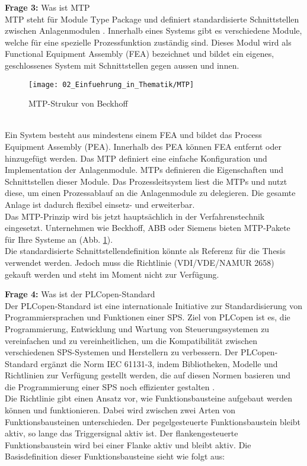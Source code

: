 	\newpage
	
	\textbf{Frage 3:} Was ist MTP \vspace{2mm} 
	\\
	MTP steht für Module Type Package und definiert standardisierte Schnittstellen zwischen Anlagenmodulen \cite{MTP}. Innerhalb eines Systems gibt es verschiedene Module, welche für eine spezielle Prozessfunktion zuständig sind. Dieses Modul wird als Functional Equipment Assembly (FEA) bezeichnet und bildet ein eigenes, geschlossenes System mit Schnittstellen gegen aussen und innen.
	\\
	\begin{figure}[h!]
		\centering
		\texttt{[image: 02\_Einfuehrung\_in\_Thematik/MTP]}
		\captionsetup{justification=centering}
		\caption{MTP-Strukur von Beckhoff}
		\label{fig:MTP}
	\end{figure}
	\\
	Ein System besteht aus mindestens einem FEA und bildet das Process Equipment Assembly (PEA). Innerhalb des PEA können FEA entfernt oder hinzugefügt werden. Das \Gls{MTP} definiert eine einfache Konfiguration und Implementation der Anlagenmodule. MTPs definieren die Eigenschaften und Schnittstellen dieser Module. Das Prozessleitsystem liest die MTPs und nutzt diese, um einen Prozessablauf an die Anlagenmodule zu delegieren. Die gesamte Anlage ist dadurch flexibel einsetz- und erweiterbar.
	\\  
	Das \Gls{MTP}-Prinzip wird bis jetzt hauptsächlich in der Verfahrenstechnik eingesetzt. Unternehmen wie Beckhoff, ABB oder Siemens bieten \Gls{MTP}-Pakete für Ihre Systeme an (Abb. \ref{fig:MTP}). 
	\\
	Die standardisierte Schnittstellendefinition könnte als Referenz für die Thesis verwendet werden. Jedoch muss die Richtlinie (VDI/VDE/NAMUR 2658) gekauft werden und steht im Moment nicht zur Verfügung. 
	\vspace{3mm}
	
	\textbf{Frage 4:} Was ist der PLCopen-Standard  \vspace{2mm} 
	\\
	Der PLCopen-Standard ist eine internationale Initiative zur Standardisierung von Programmiersprachen und Funktionen einer \Gls{SPS}. Ziel von PLCopen ist es, die Programmierung, Entwicklung und Wartung von Steuerungssystemen zu vereinfachen und zu vereinheitlichen, um die Kompatibilität zwischen verschiedenen \Gls{SPS}-Systemen und Herstellern zu verbessern. Der PLCopen-Standard ergänzt die Norm IEC 61131-3, indem Bibliotheken, Modelle und Richtlinien zur Verfügung gestellt werden, die auf diesen Normen basieren und die Programmierung einer \Gls{SPS} noch effizienter gestalten \cite{PLCopen}.
	\\
	Die Richtlinie gibt einen Ansatz vor, wie Funktionsbausteine aufgebaut werden können und funktionieren. Dabei wird zwischen zwei Arten von Funktionsbausteinen unterschieden. Der pegelgesteuerte Funktionsbaustein bleibt aktiv, so lange das Triggersignal aktiv ist. Der flankengesteuerte Funktionsbaustein wird bei einer Flanke aktiv und bleibt aktiv. Die Basisdefinition dieser Funktionsbausteine sieht wie folgt aus: 
	
